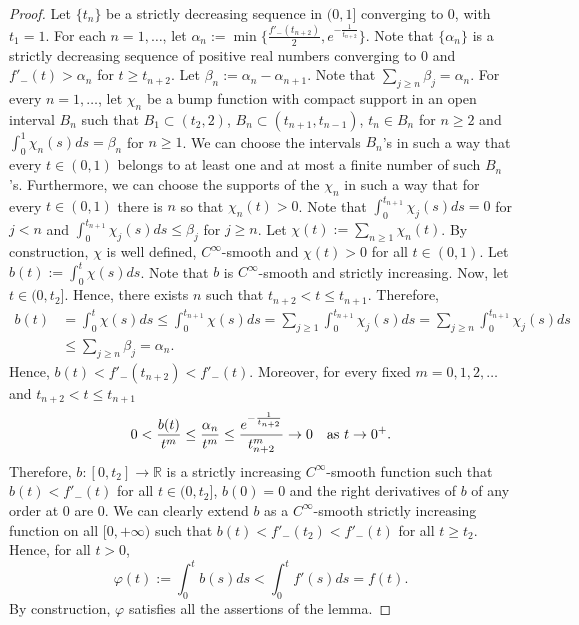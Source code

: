 \documentclass[12pt]{amsart}
\theoremstyle{definition}
\theoremstyle{remark}
\numberwithin{equation}{section}
\def\R{\mathbb R}
\begin{document}
\begin{proof}
Let $\{t_n\}$ be a strictly decreasing sequence in $(0,1]$ converging to $0$, with $t_1=1$. For each $n=1,\ldots$, let $\alpha_n:=\min\{\frac{f'_-(t_{n+2})}{2}, e^{-\frac{1}{t_{n+2}}}\}$. Note that $\{\alpha_n\}$ is a strictly decreasing sequence of positive real numbers converging to $0$ and $f'_-(t)>\alpha_n$ for $t\geq t_{n+2}$. Let $\beta_n:=\alpha_n-\alpha_{n+1}$. Note that $\sum_{j\geq n}\beta_j=\alpha_n$. For every $n=1,\ldots$, let $\chi_n$ be a bump function with compact support in an open interval $B_n$ such that $B_1\subset (t_2, 2)$, $B_n\subset (t_{n+1}, t_{n-1})$, $t_n\in B_n$ for $n\geq 2$ and  $\int_0^1\chi_n(s)ds=\beta_n$ for $n\geq 1$. We can choose the intervals $B_n$'s in such a way that every $t\in (0,1)$ belongs to at least one and at most a finite number of such $B_n$'s. Furthermore, we can choose the supports of the $\chi_n$ in such a way that for every $t\in (0,1)$ there is $n$ so that $\chi_n(t)>0$. Note that $\int_0^{t_{n+1}} \chi_j(s)ds=0$ for $j<n$ and $\int_0^{t_{n+1}}\chi_j(s)ds\leq \beta_j$ for $j\geq n$.  Let $\chi(t):=\sum_{n\geq 1}\chi_n(t)$. By construction, $\chi$ is well defined, $C^\infty$-smooth and $\chi(t)>0$ for all $t\in (0,1)$. Let $b(t):=\int_0^t \chi(s)ds$. Note that $b$ is $C^\infty$-smooth and strictly increasing. Now, let $t\in (0,t_2]$. Hence, there exists $n$ such that $t_{n+2}<t\leq t_{n+1}$. Therefore, 
 \begin{equation*}
 \begin{split}
b(t)&=\int_0^t \chi(s)ds\leq \int_0^{t_{n+1}} \chi(s)ds=\sum_{j\geq 1}\int_0^{t_{n+1}}\chi_j(s)ds=\sum_{j\geq n}\int_0^{t_{n+1}}\chi_j(s)ds\\&\leq \sum_{j\geq n}\beta_j=\alpha_{n}.
 \end{split}
 \end{equation*}
Hence, $b(t)< f'_-(t_{n+2})<f'_-(t)$. Moreover, for every fixed $m=0,1,2,\ldots$ and $t_{n+2}<t\leq t_{n+1}$
 \[
0<\frac{b(t)}{t^m}\leq \frac{\alpha_n}{t^m}\leq \frac{e^{-\frac{1}{t_{n+2}}}}{t_{n+2}^m}\to 0 \quad \hbox{as\ }t\to 0^+.
 \]
Therefore, $b:[0,t_2]\to\R$ is a strictly increasing $C^\infty$-smooth function such that $b(t)< f'_-(t)$ for all $t\in (0,t_2]$, $b(0)=0$ and the right derivatives of $b$ of any order at $0$ are $0$. We can clearly extend $b$ as a $C^\infty$-smooth strictly increasing function on all $[0,+\infty)$ such that $b(t)< f'_-(t_2)<f'_-(t)$ for all $t\geq t_2$. Hence, for all $t>0$,
\[
\varphi(t):=\int_0^t b(s)ds<\int_0^t f'(s)ds=f(t).
\]
By construction, $\varphi$ satisfies all the assertions of the lemma.
\end{proof}
\end{document}
